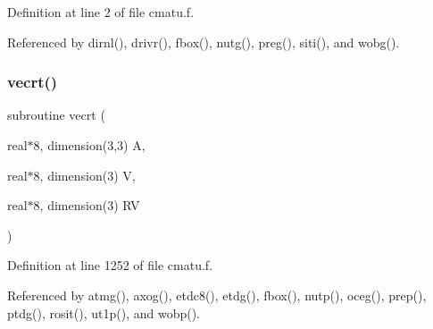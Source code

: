 Definition at line 2 of file cmatu.\+f.



Referenced by dirnl(), drivr(), fbox(), nutg(), preg(), siti(), and wobg().

\mbox{\label{cmatu_8f_a77ea712db6bef8c4347335d795ab08ea}} 
\subsubsection{\texorpdfstring{vecrt()}{vecrt()}}
{\footnotesize\ttfamily subroutine vecrt (\begin{DoxyParamCaption}\item[{real$\ast$8, dimension(3,3)}]{A,  }\item[{real$\ast$8, dimension(3)}]{V,  }\item[{real$\ast$8, dimension(3)}]{RV }\end{DoxyParamCaption})}



Definition at line 1252 of file cmatu.\+f.



Referenced by atmg(), axog(), etdc8(), etdg(), fbox(), nutp(), oceg(), prep(), ptdg(), rosit(), ut1p(), and wobp().

